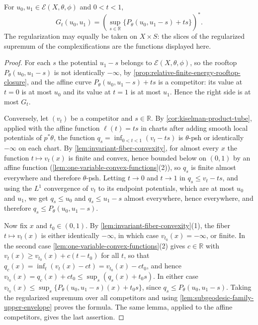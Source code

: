 \begin{proposition}\label{prop:perron-rooftop-legendre-formula}
For $u_0,u_1\in\mathcal E(X,\theta,\phi)$ and $0<t<1$,
\[
 G_t(u_0,u_1)
   =\left(\sup_{s\in\mathbb R}
                    \{P_\theta(u_0,u_1-s)+ts\}\right)^*.
\]
The regularization may equally be taken on $X\times S$: the slices of the regularized supremum of the complexifications are the functions displayed here.
\end{proposition}
\begin{proof}
For each $s$ the potential $u_1-s$ belongs to $\mathcal E(X,\theta,\phi)$, so the rooftop $P_\theta(u_0,u_1-s)$ is not identically $-\infty$, by \cref{prop:relative-finite-energy-rooftop-closure}, and the affine curve $P_\theta(u_0,u_1-s)+ts$ is a competitor: its value at $t=0$ is at most $u_0$ and its value at $t=1$ is at most $u_1$. Hence the right side is at most $G_t$.

Conversely, let $(v_t)$ be a competitor and $s\in\mathbb R$. By \cref{cor:kiselman-product-tube}, applied with the affine function $\ell(t)=ts$ in charts after adding smooth local potentials of $p^*\theta$, the function $q_s=\inf_{0<t<1}(v_t-ts)$ is $\theta$-psh or identically $-\infty$ on each chart. By \cref{lem:invariant-fiber-convexity}, for almost every $x$ the function $t\mapsto v_t(x)$ is finite and convex, hence bounded below on $(0,1)$ by an affine function (\cref{lem:one-variable-convex-functions}(2)), so $q_s$ is finite almost everywhere and therefore $\theta$-psh. Letting $t\to0$ and $t\to1$ in $q_s\leq v_t-ts$, and using the $L^1$ convergence of $v_t$ to its endpoint potentials, which are at most $u_0$ and $u_1$, we get $q_s\leq u_0$ and $q_s\leq u_1-s$ almost everywhere, hence everywhere, and therefore $q_s\leq P_\theta(u_0,u_1-s)$.

Now fix $x$ and $t_0\in(0,1)$. By \cref{lem:invariant-fiber-convexity}(1), the fiber $t\mapsto v_t(x)$ is either identically $-\infty$, in which case $v_{t_0}(x)=-\infty$, or finite. In the second case \cref{lem:one-variable-convex-functions}(2) gives $c\in\mathbb R$ with $v_t(x)\geq v_{t_0}(x)+c(t-t_0)$ for all $t$, so that $q_c(x)=\inf_t(v_t(x)-ct)=v_{t_0}(x)-ct_0$, and hence $v_{t_0}(x)=q_c(x)+ct_0\leq\sup_s(q_s(x)+t_0s)$. In either case $v_{t_0}(x)\leq\sup_s\{P_\theta(u_0,u_1-s)(x)+t_0s\}$, since $q_s\leq P_\theta(u_0,u_1-s)$. Taking the regularized supremum over all competitors and using \cref{lem:subgeodesic-family-upper-envelope} proves the formula. The same lemma, applied to the affine competitors, gives the last assertion.
\end{proof}

